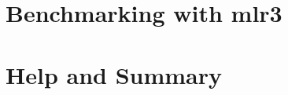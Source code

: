 \documentclass[11pt,compress,t,notes=noshow, xcolor=table]{beamer}
\begin{document}
\section{Benchmarking with mlr3}


\section{Help and Summary}




\endlecture
\end{document}
